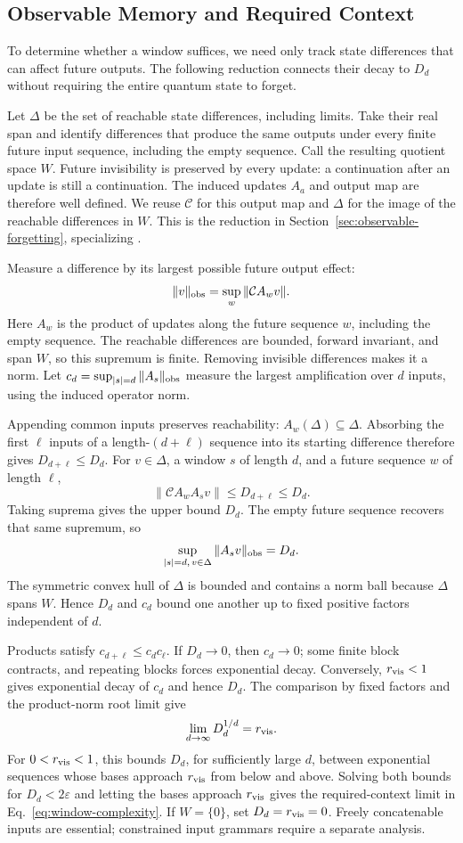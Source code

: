 \subsection{Observable Memory and Required Context}
\label{app:observable-proof}

To determine whether a window suffices, we need only track state differences
that can affect future outputs. The following reduction connects their
decay to $D_d$ without requiring the entire quantum state to forget.

Let $\Delta$ be the set of reachable state differences, including limits.
Take their real span and identify differences that produce the same outputs
under every finite future input sequence, including the empty sequence.
Call the resulting quotient space $W$. Future invisibility is preserved
by every update: a continuation after an update is still a continuation.
The induced updates $A_a$ and output map are therefore well defined. We
reuse $\mathcal C$ for this output map and $\Delta$ for the image of the
reachable differences in $W$. This is the reduction in
Section~\ref{sec:observable-forgetting}, specializing
\cite[Theorem~III.1]{petreczky2026stability}.

Measure a difference by its largest possible future output effect:
\[
 \|v\|_{\rm obs}=\sup_w\|\mathcal C A_wv\|.
\]
Here $A_w$ is the product of updates along the future sequence $w$,
including the empty sequence. The reachable differences are bounded,
forward invariant, and span $W$, so this supremum is finite. Removing
invisible differences makes it a norm. Let
$c_d=\sup_{|s|=d}\|A_s\|_{\rm obs}$ measure the largest amplification over
$d$ inputs, using the induced operator norm.

Appending common inputs preserves reachability:
$A_w(\Delta)\subseteq\Delta$. Absorbing the first $\ell$ inputs of a
length-$(d+\ell)$ sequence into its starting difference therefore gives
$D_{d+\ell}\leq D_d$. For $v\in\Delta$, a window $s$ of length $d$, and
a future sequence $w$ of length $\ell$,
\[
 \|\mathcal C A_wA_sv\|\leq D_{d+\ell}\leq D_d.
\]
Taking suprema gives the upper bound $D_d$. The empty future sequence
recovers that same supremum, so
\[
 \sup_{|s|=d,\,v\in\Delta}\|A_sv\|_{\rm obs}=D_d.
\]
The symmetric convex hull of $\Delta$ is bounded and contains a norm ball
because $\Delta$ spans $W$. Hence $D_d$ and $c_d$ bound one another up to
fixed positive factors independent of $d$.

Products satisfy $c_{d+\ell}\leq c_dc_\ell$. If $D_d\to0$, then $c_d\to0$;
some finite block contracts, and repeating blocks forces exponential decay.
Conversely, $r_{\rm vis}<1$ gives exponential decay of $c_d$ and hence $D_d$.
The comparison by fixed factors and the product-norm root limit give
\[
 \lim_{d\to\infty}D_d^{1/d}=r_{\rm vis}.
\]
For $0<r_{\rm vis}<1$, this bounds $D_d$, for sufficiently large $d$,
between exponential sequences whose bases approach $r_{\rm vis}$ from
below and above. Solving both bounds for $D_d<2\varepsilon$ and letting the
bases approach $r_{\rm vis}$ gives the required-context limit in
Eq.~\eqref{eq:window-complexity}. If $W=\{0\}$, set $D_d=r_{\rm vis}=0$.
Freely concatenable inputs are essential; constrained input grammars
require a separate analysis.

